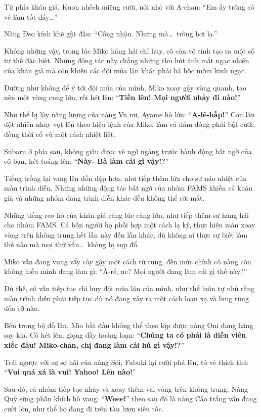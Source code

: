 \documentclass[../main.tex]{subfiles}
\begin{document}
Từ phía khán giả, Kuon nhếch miệng cười, nói nhỏ với A-chan: ``{Em ấy trông có vẻ làm tốt đấy\dots}''

Nàng Đeo kính khẽ gật đầu: ``Công nhận. Nhưng mà\dots\ trông hơi lạ.''

Không những vậy, trong lúc Miko hăng hái chỉ huy, cô còn vô tình tạo ra một số tư thế đặc biệt. Những động tác này chẳng những thu hút ánh mắt ngạc nhiên của khán giả mà còn khiến các đội múa lân khác phải há hốc mồm kinh ngạc.

Dường như không để ý tới đội múa của mình, Miko xoay gậy vòng quanh, tạo nên một vòng cung lớn, rồi hét lên: ``\textbf{Tiến lên! Mọi người nhảy đi nào!}''

Như thể bị lây năng lượng của nàng Vu nữ, Ayame hô lớn: ``\textbf{A-lê-hấp!}'' Con lân đột nhiên nhảy vọt lên theo hiệu lệnh của Miko, làm cả đám đông phải bật cười, đồng thời cổ vũ một cách nhiệt liệt.

Subaru ở phía sau, không giấu được vẻ ngỡ ngàng trước hành động bất ngờ của cô bạn, hét toáng lên: ``\textbf{Này- Bà làm cái gì vậy!?}''

Tiếng trống lại vang lên dồn dập hơn, như tiếp thêm lửa cho sự náo nhiệt của màn trình diễn. Nhưng những động tác bất ngờ của nhóm FAMS khiến cả khán giả và những nhóm đang trình diễn khác đều không thể rời mắt.

Những tiếng reo hò của khán giả càng lúc càng lớn, như tiếp thêm sự hăng hái cho nhóm FAMS. Cả bốn người họ phối hợp một cách lạ kỳ, thực hiện màn xoay vòng trên không trung hết lần này đến lần khác, dù không ai thực sự biết làm thế nào mà mọi thứ vẫn\dots\ không bị sụp đổ.

Miko vẫn đang vung vẩy cây gậy một cách tứ tung, đến mức chính cô nàng còn không hiểu mình đang làm gì: ``À-rế, ne? Mọi người đang làm cái gì thế này?''

Dù thế, cô vẫn tiếp tục chỉ huy đội múa lân của mình, như thể luôn tự nhủ rằng màn trình diễn phải tiếp tục dù nó đang xảy ra một cách loạn xạ và lung tung đến cỡ nào.

Bên trong bộ đồ lân, Mio bắt đầu không thể theo kịp được nàng Oni đang hăng say kia. Cô hét lên, giọng đầy hoảng loạn: ``\textbf{Chúng ta có phải là diễn viên xiếc đâu! Miko-chan, chị đang làm cái hú gì vậy!?}''

Trái ngược với sự sợ hãi của nàng Sói, Fubuki lại cười phá lên, tỏ vẻ thích thú: ``\textbf{Vui quá xá là vui! Yahoo! Lên nào!}''

Sau đó, cả nhóm tiếp tục nhảy và xoay thêm vài vòng trên không trung. Nàng Quỷ sừng phấn khích hô vang: ``\textbf{Weee!}'' theo sau đó là nàng Cáo trắng vẫn đang cười lớn, như thể họ đang đi trên tàu lượn siêu tốc.
\end{document}
